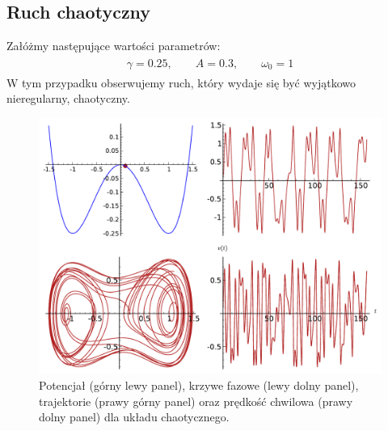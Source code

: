 \documentclass[a4paper,12pt,polish]{sphinxmanual}
\begin{document}
\subsection{Ruch chaotyczny}
\label{ch2/chII011:ruch-chaotyczny}
Załóżmy następujące wartości parametrów:
\label{ch2/chII011:equation-eqn21}\begin{gather}
\begin{split}\gamma = 0.25, \qquad A = 0.3, \qquad \omega_0 = 1\end{split}\label{ch2/chII011-eqn21}
\end{gather}
W tym przypadku obserwujemy ruch, który wydaje się być wyjątkowo nieregularny, chaotyczny.
\begin{figure}[htbp]
\centering
\capstart

\includegraphics{sage_chII011_10.pdf}
\caption{Potencjał (górny lewy panel), krzywe fazowe (lewy dolny panel),
trajektorie (prawy górny panel) oraz prędkość chwilowa (prawy
dolny panel) dla układu chaotycznego.}\end{figure}
\end{document}
